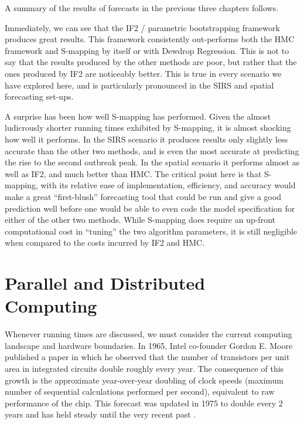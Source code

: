 

	A summary of the results of forecasts in the previous three chapters follows.

	Immediately, we can see that the IF2 / parametric bootstrapping framework produces great results. This framework consistently out-performs both the HMC framework and S-mapping by itself or with Dewdrop Regression. This is not to say that the results produced by the other methods are poor, but rather that the ones produced by IF2 are noticeably better. This is true in every scenario we have explored here, and is particularly pronounced in the SIRS and spatial forecasting set-ups.

	A surprise has been how well S-mapping has performed. Given the almost ludicrously shorter running times exhibited by S-mapping, it is almost shocking how well it performs. In the SIRS scenario it produces results only slightly less accurate than the other two methods, and is even the most accurate at predicting the rise to the second outbreak peak. In the spatial scenario it performs almost as well as IF2, and much better than HMC. The critical point here is that S-mapping, with its relative ease of implementation, efficiency, and accuracy would make a great ``first-blush'' forecasting tool that could be run and give a good prediction well before one would be able to even code the model specification for either of the other two methods. While S-mapping does require an up-front computational cost in ``tuning'' the two algorithm parameters, it is still negligible when compared to the costs incurred by IF2 and HMC.


\section{Parallel and Distributed Computing}

	Whenever running times are discussed, we must consider the current computing landscape and hardware boundaries. In 1965, Intel co-founder Gordon E. Moore published a paper in which he observed that the number of transistors per unit area in integrated circuits double roughly every year. The consequence of this growth is the approximate year-over-year doubling of clock speeds (maximum number of sequential calculations performed per second), equivalent to raw performance of the chip. This forecast was updated in 1975 to double every 2 years and has held steady until the very recent past \cite{Waldrop2016}.

